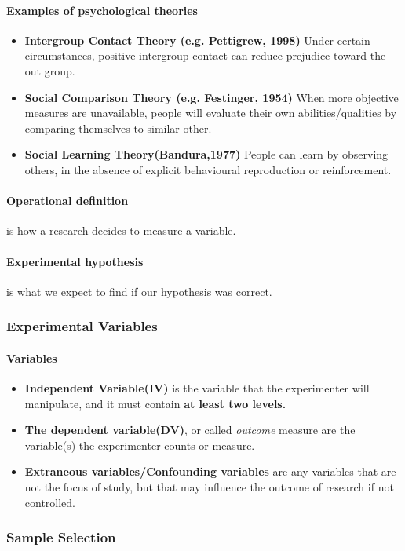 \documentclass{article}
\begin{document}
 	\paragraph{Examples of psychological theories}
 	\begin{itemize}
 		\item \textbf{Intergroup Contact Theory (e.g. Pettigrew, 1998)} Under certain circumstances, positive intergroup contact can reduce prejudice toward the out group.
 		\item \textbf{Social Comparison Theory (e.g. Festinger, 1954)} When more objective measures are unavailable, people will evaluate their own abilities/qualities by comparing themselves to similar other.
 		\item \textbf{Social Learning Theory(Bandura,1977)} People can learn by observing others, in the absence of explicit behavioural reproduction or reinforcement.
 	\end{itemize}
 	\paragraph{Operational definition} is how a research decides to measure a variable.
 	\paragraph{Experimental hypothesis} is what we expect to find if our hypothesis was correct.
 	\subsubsection{Experimental Variables}
 	\paragraph{Variables}
 	\begin{itemize}
 		\item \textbf{Independent Variable(IV)} is the variable that the experimenter will manipulate, and it must contain \textbf{at least two levels.}
 		\item \textbf{The dependent variable(DV)}, or called \emph{outcome} measure are the variable(s) the experimenter counts or measure.
 		\item \textbf{Extraneous variables/Confounding variables} are any variables that are not the focus of study, but that may influence the outcome of research if not controlled.
 	\end{itemize}
 	\subsubsection{Sample Selection}
\end{document}

